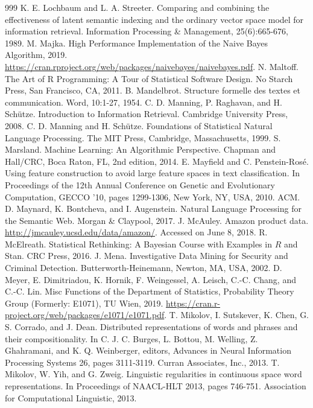 \documentclass[11pt,openany,executivepaper]{book}
\begin{document}
\begin{thebibliography}{999}
 K. E. Lochbaum and L. A. Streeter. Comparing and combining the effectiveness of latent semantic indexing and the ordinary vector space model for information retrieval. Information Processing \& Management, 25(6):665-676, 1989.
 M. Majka. High Performance Implementation of the Naive Bayes Algorithm, 2019. \url{https://cran.rproject.org/web/packages/naivebayes/naivebayes.pdf}.
 N. Maltoff. The Art of R Programming: A Tour of Statistical Software Design. No Starch Press, San Francisco, CA, 2011.
 B. Mandelbrot. Structure formelle des textes et communication. Word, 10:1-27, 1954.
 C. D. Manning, P. Raghavan, and H. Schütze. Introduction to Information Retrieval. Cambridge University Press, 2008.
 C. D. Manning and H. Schütze. Foundations of Statistical Natural Language Processing. The MIT Press, Cambridge, Massachusetts, 1999.
 S. Marsland. Machine Learning: An Algorithmic Perspective. Chapman and Hall/CRC, Boca Raton, FL, 2nd edition, 2014.
 E. Mayfield and C. Penstein-Rosé. Using feature construction to avoid large feature spaces in text classification. In Proceedings of the 12th Annual Conference on Genetic and Evolutionary Computation, GECCO '10, pages 1299-1306, New York, NY, USA, 2010. ACM.
 D. Maynard, K. Bontcheva, and I. Augenstein. Natural Language Processing for the Semantic Web. Morgan \& Claypool, 2017.
 J. McAuley. Amazon product data. \url{http://jmcauley.ucsd.edu/data/amazon/}. Accessed on June 8, 2018.
 R. McElreath. Statistical Rethinking: A Bayesian Course with Examples in $R$ and Stan. CRC Press, 2016.
 J. Mena. Investigative Data Mining for Security and Criminal Detection. Butterworth-Heinemann, Newton, MA, USA, 2002.
 D. Meyer, E. Dimitriadou, K. Hornik, F. Weingessel, A. Leisch, C.-C. Chang, and C.-C. Lin. Misc Functions of the Department of Statistics, Probability Theory Group (Formerly: E1071), TU Wien, 2019. \href{https://cran.r-project.org/web/packages/e1071/e1071.pdf}{https://cran.r-project.org/web/packages/e1071/e1071.pdf}.
 T. Mikolov, I. Sutskever, K. Chen, G. S. Corrado, and J. Dean. Distributed representations of words and phrases and their compositionality. In C. J. C. Burges, L. Bottou, M. Welling, Z. Ghahramani, and K. Q. Weinberger, editors, Advances in Neural Information Processing Systems 26, pages 3111-3119. Curran Associates, Inc., 2013.
 T. Mikolov, W. Yih, and G. Zweig. Linguistic regularities in continuous space word representations. In Proceedings of NAACL-HLT 2013, pages 746-751. Association for Computational Linguistic, 2013.

\end{thebibliography}
\end{document}
